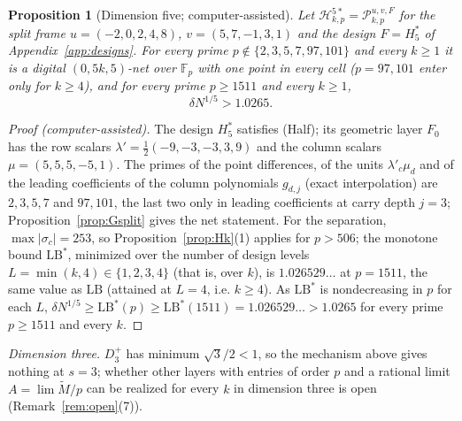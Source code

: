\documentclass[11pt]{amsart}
\newtheorem{proposition}[theorem]{Proposition}
\theoremstyle{definition}
\theoremstyle{plain}
\newcommand{\F}{\mathbb{F}}
\begin{document}
\begin{proposition}[Dimension five; computer-assisted]\label{prop:HL5}
Let $\mathcal H^{5*}_{k,p}=\mathcal P^{u,v,F}_{k,p}$ for the split frame $u=(-2,0,2,4,8)$, $v=(5,7,-1,3,1)$ and the design $F=H_5^*$ of Appendix~\ref{app:designs}. For every prime $p\notin\{2,3,5,7,97,101\}$ and every $k\ge1$ it is a digital $(0,5k,5)$-net over $\F_p$ with one point in every cell ($p=97,101$ enter only for $k\ge4$), and for every prime $p\ge1511$ and every $k\ge1$,
\[
\delta N^{1/5}>1.0265 .
\]
\end{proposition}

\begin{proof}[Proof (computer-assisted)]
The design $H_5^*$ satisfies (Half); its geometric layer $F_0$ has the row scalars $\lambda'=\frac12(-9,-3,-3,3,9)$ and the column scalars $\mu=(5,5,5,-5,1)$. The primes of the point differences, of the units $\lambda'_c\mu_d$ and of the leading coefficients of the column polynomials $g_{d,j}$ (exact interpolation) are $2,3,5,7$ and $97,101$, the last two only in leading coefficients at carry depth $j=3$; Proposition~\ref{prop:Gsplit} gives the net statement. For the separation, $\max|\sigma_c|=253$, so Proposition~\ref{prop:Hk}(1) applies for $p>506$; the monotone bound $\mathrm{LB}^*$, minimized over the number of design levels $L=\min(k,4)\in\{1,2,3,4\}$ (that is, over $k$), is $1.026529\ldots$ at $p=1511$, the same value as $\mathrm{LB}$ (attained at $L=4$, i.e. $k\ge4$). As $\mathrm{LB}^*$ is nondecreasing in $p$ for each $L$, $\delta N^{1/5}\ge\mathrm{LB}^*(p)\ge\mathrm{LB}^*(1511)=1.026529\ldots>1.0265$ for every prime $p\ge1511$ and every $k$.
\end{proof}

\emph{Dimension three.} $D_3^+$ has minimum $\sqrt3/2<1$, so the mechanism above gives nothing at $s=3$; whether other layers with entries of order $p$ and a rational limit $A=\lim\tilde M/p$ can be realized for every $k$ in dimension three is open (Remark~\ref{rem:open}(7)).
\end{document}
